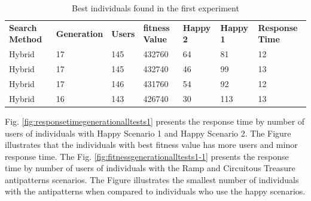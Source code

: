 \begin{table}[h]
\centering
\caption{Best individuals found in the first experiment}
\label{tab:bestindividuals}
\begin{tabular}{lllllll}
\rowcolor[HTML]{C0C0C0} 
\textbf{Search Method} & \textbf{Generation} & \textbf{Users} & \textbf{fitness Value} & \textbf{Happy 2} & \textbf{Happy 1} & \textbf{Response Time} \\
Hybrid & 17 & 145 & 432760 & 64 & 81 & 12 \\
Hybrid & 17 & 145 & 432740 & 46 & 99 & 13 \\
Hybrid & 17 & 146 & 431760 & 54 & 92 & 12 \\
Hybrid & 16 & 143 & 426740 & 30 & 113 & 13
\end{tabular}
\end{table}

Fig. \ref{fig:responsetimegenerationalltests1} presents the response time by number of users of individuals with Happy Scenario 1 and Happy Scenario 2. The Figure illustrates that the individuals with best fitness value has more users and minor response time. The Fig. \ref{fig:fitnessgenerationalltests1-1} presents the response time by number of users of individuals with the Ramp and Circuitous Treasure antipatterns scenarios. The Figure illustrates the smallest number of individuals with the antipatterns when compared to individuals who use the happy scenarios.



